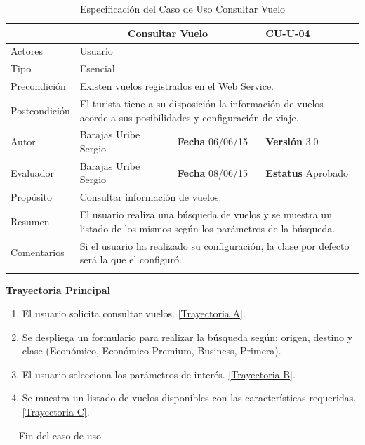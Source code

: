 \begin{longtable}{|p{2.5cm}|p{6.4cm}|p{2cm}|p{2cm}|}
	\hline
		\rowcolor[RGB]{51,153,255}{Caso de Uso}&\multicolumn{2}{c}{Consultar Vuelo}&{\textbf{CU-U-04}}\\
	\hline
		{Actores}&\multicolumn{3}{p{11.2cm}|}{Usuario}\\
	\hline
		{Tipo}&\multicolumn{3}{p{11.2cm}|}{Esencial}\\
	\hline
		{Precondición}&\multicolumn{3}{p{11.2cm}|}{Existen vuelos registrados en el Web Service.}\\
	\hline
		{Postcondición}&\multicolumn{3}{p{11.2cm}|}{El turista tiene a su disposición la información de vuelos acorde a sus posibilidades y configuración de viaje.}\\
	\hline
		{Autor}&{Barajas Uribe Sergio}&{\textbf{Fecha} 06/06/15}&{\textbf{Versión} 3.0}\\
			\hline
		{Evaluador}&{Barajas Uribe Sergio}&{\textbf{Fecha} 08/06/15}&{\textbf{Estatus} Aprobado}\\
	\hline
		{Propósito}&\multicolumn{3}{p{11.2cm}|}{Consultar información de vuelos.}\\
	\hline
		{Resumen}&\multicolumn{3}{p{11.2cm}|}{El usuario realiza una búsqueda de vuelos y se muestra un listado de los mismos según los parámetros de la búsqueda.}\\	
	\hline
		{Comentarios}&\multicolumn{3}{p{11.2cm}|}{Si el usuario ha realizado su configuración, la clase por defecto será la que el configuró.}\\	
	\hline
	\caption[Especificación del Caso de Uso Consultar Vuelo]{Especificación del Caso de Uso Consultar Vuelo}
    	\label{tab:cuConsultarVuelo}
\end{longtable}
\newpage
\begin{flushleft}
	\textbf{Trayectoria Principal}\\
	\begin{enumerate}
		\item El usuario solicita consultar vuelos. \hyperlink{TrayectoriaA_CU-U-04}{[Trayectoria A]}.
		\item Se despliega un formulario para realizar la búsqueda según: origen, destino y clase (Económico, Económico Premium, Business, Primera).
		\item El usuario selecciona los parámetros de interés. \hyperlink{TrayectoriaB_CU-U-04}{[Trayectoria B]}.
		\item Se  muestra un listado de vuelos disponibles con las características requeridas. \hyperlink{TrayectoriaC_CU-U-04}{[Trayectoria C]}.
	\end{enumerate}
\end{flushleft}
----Fin del caso de uso

